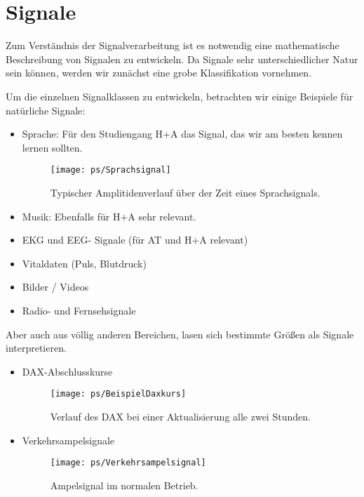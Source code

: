 \chapter{Signale}
Zum Verständnis der Signalverarbeitung ist es notwendig eine
mathematische Beschreibung von Signalen zu entwickeln.
Da Signale sehr unterschiedlicher Natur sein können, werden wir zunächst eine grobe
Klassifikation vornehmen.

Um die einzelnen Signalklassen zu entwickeln, betrachten wir
einige Beispiele für natürliche Signale:

\begin{itemize}
    \item Sprache: Für den Studiengang H+A das Signal, das wir am besten
    kennen lernen sollten.
\begin{figure}[H]
\begin{center}
\texttt{[image: ps/Sprachsignal]}
\caption{\label{pic:Sprachsignal} Typischer Amplitidenverlauf über
der Zeit eines Sprachsignals.}
\end{center}
\end{figure}

    \item Musik: Ebenfalls für H+A sehr relevant.
    \item EKG und EEG- Signale (für AT und H+A relevant)
    \item Vitaldaten (Puls, Blutdruck)
    \item Bilder / Videos
    \item Radio- und Fernsehsignale
\end{itemize}

Aber auch aus völlig anderen Bereichen, lasen sich bestimmte
Größen als Signale interpretieren.
\begin{itemize}
    \item DAX-Abschlusskurse
\begin{figure}[H]
\begin{center}
\texttt{[image: ps/BeispielDaxkurs]}
\caption{\label{pic:Daxkurs} Verlauf des DAX bei einer Aktualisierung alle zwei Stunden.}
\end{center}
\end{figure}

    \item Verkehrsampelsignale

\begin{figure}[H]
\begin{center}
\texttt{[image: ps/Verkehrsampelsignal]}
\caption{\label{pic:Verkehrsampel} Ampelsignal im normalen Betrieb.}
\end{center}
\end{figure}

\end{itemize}

